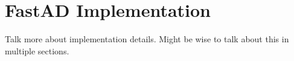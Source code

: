 \section{FastAD Implementation}

Talk more about implementation details.
Might be wise to talk about this in multiple sections.
